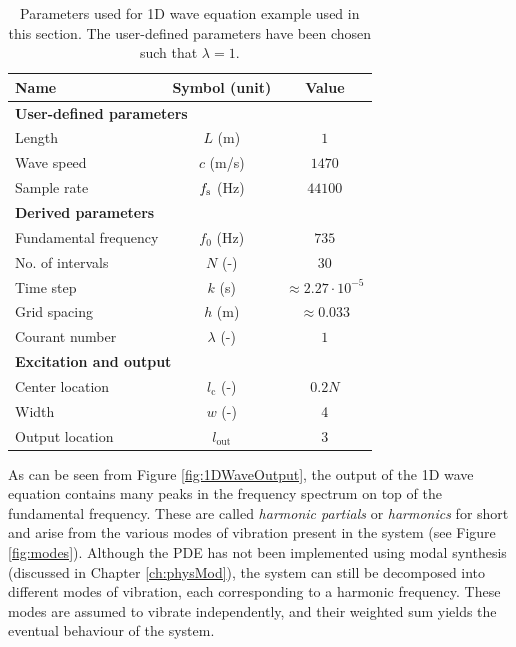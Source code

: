 \begin{table}[h]
    \begin{center}
    \begin{tabular}{|l|c|c|}
        \hline
        Name & Symbol (unit) & Value\\ \hline
        \multicolumn{3}{|l|}{\bf User-defined parameters}\\ \hline
        Length & $L$ (m) & $1$\\
        Wave speed & $c$ (m/s) & $1470$\\
        Sample rate & $f_\text{s}$ (Hz) & $44100$ \\\hline
        \multicolumn{3}{|l|}{\bf Derived parameters}\\ \hline
        Fundamental frequency & $f_0$ (Hz) & $735$\\
        No. of intervals & $N$ (-) & $30$ \\
        Time step & $k$ (s)& $\approx 2.27\cdot 10^{-5}$ \\
        Grid spacing & $h$ (m)& $\approx 0.033$ \\
        Courant number & $\lambda$ (-)& $1$ \\\hline
        \multicolumn{3}{|l|}{\bf Excitation and output}\\ \hline
        Center location& $l_\text{c}$ (-)& $0.2N$\\
        Width& $w$ (-)& 4\\
        Output location & $l_\text{out}$ & 3 \\\hline
    \end{tabular}
    \caption{Parameters used for 1D wave equation example used in this section. The user-defined parameters have been chosen such that $\lambda = 1$. \label{tab:1DWaveParams}}
    \end{center}
\end{table}

As can be seen from Figure \ref{fig:1DWaveOutput}, the output of the 1D wave equation contains many peaks in the frequency spectrum on top of the fundamental frequency. These are called \textit{harmonic partials} or \textit{harmonics} for short and arise from the various modes of vibration present in the system (see Figure \ref{fig:modes}). Although the PDE has not been implemented using modal synthesis (discussed in Chapter \ref{ch:physMod}), the system can still be decomposed into different modes of vibration, each corresponding to a harmonic frequency. These modes are assumed to vibrate independently, and their weighted sum yields the eventual behaviour of the system. 

